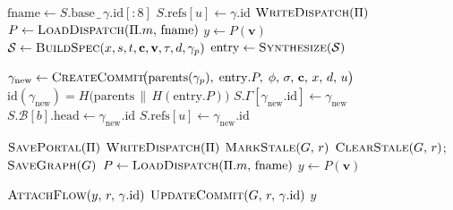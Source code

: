 \begin{algorithm}[t]
\begin{algorithmic}[1]
\Statex {}
  \State $\mathrm{fname} \gets S.\mathrm{base} \,\texttt{\_}\, \gamma.\mathrm{id}[{:}8]$
    \State $S.\mathrm{refs}[u] \gets \gamma.\mathrm{id}$
    \State $\textsc{WriteDispatch}(\Pi)$
  \EndIf
  \State $P \gets \textsc{LoadDispatch}(\Pi.m,\, \mathrm{fname})$
  \State $y \gets P(\mathbf{v})$
\Else
  \State $\mathcal{S} \gets \textsc{BuildSpec}(x, s, t, \mathbf{c}, \mathbf{v}, \tau, d, \gamma_p)$
  \State $\mathrm{entry} \gets \textsc{Synthesize}(\mathcal{S})$

  \Statex \hspace{\algorithmicindent}
  \State $\gamma_{\mathrm{new}} \gets \textsc{CreateCommit}\!\bigl(
    \mathrm{parents}(\gamma_p),\;
    \mathrm{entry}.P,\;
    \phi,\, \sigma,\, \mathbf{c},\, x,\, d,\, u
    \bigr)$
  \Statex \hfill $\mathrm{id}(\gamma_{\mathrm{new}}) = H\!\bigl(\mathrm{parents} \,\|\, H(\mathrm{entry}.P)\bigr)$
  \State $S.\Gamma[\gamma_{\mathrm{new}}.\mathrm{id}] \gets \gamma_{\mathrm{new}}$
  \State $S.\mathcal{B}[b].\mathrm{head} \gets \gamma_{\mathrm{new}}.\mathrm{id}$
  \State $S.\mathrm{refs}[u] \gets \gamma_{\mathrm{new}}.\mathrm{id}$

  \Statex \hspace{\algorithmicindent}
  \State $\textsc{SavePortal}(\Pi)$
  \State $\textsc{WriteDispatch}(\Pi)$
  \State $\textsc{MarkStale}(G,\, r)$
  \State $\textsc{ClearStale}(G,\, r)$;\quad
         $\textsc{SaveGraph}(G)$
  \State $P \gets \textsc{LoadDispatch}(\Pi.m,\, \mathrm{fname})$
  \State $y \gets P(\mathbf{v})$
\EndIf

\Statex {}
\State $\textsc{AttachFlow}(y,\, r,\, \gamma.\mathrm{id})$
\State $\textsc{UpdateCommit}(G,\, r,\, \gamma.\mathrm{id})$
\State \Return $y$

\end{algorithmic}
\end{algorithm}


